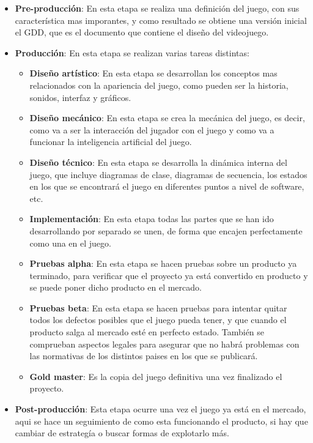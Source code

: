 \begin{itemize}
  \item \textbf{Pre-producción}: En esta etapa se realiza una definición del juego, con sus característica mas imporantes, y como resultado se obtiene una versión inicial el GDD, que es el documento que contiene el diseño del videojuego.
  \item \textbf{Producción}: En esta etapa se realizan varias tareas distintas:

  \begin{itemize}
    \item \textbf{Diseño artístico}: En esta etapa se desarrollan los conceptos mas relacionados con la apariencia del juego, como pueden ser la historia, sonidos, interfaz y gráficos.
    \item \textbf{Diseño mecánico}: En esta etapa se crea la mecánica del juego, es decir, como va a ser la interacción del jugador con el juego y como va a funcionar la inteligencia artificial del juego.
    \item \textbf{Diseño técnico}: En esta etapa se desarrolla la dinámica interna del juego, que incluye diagramas de clase, diagramas de secuencia, los estados en los que se encontrará el juego en diferentes puntos a nivel de software, etc.
    \item \textbf{Implementación}: En esta etapa todas las partes que se han ido desarrollando por separado se unen, de forma que encajen perfectamente como una en el juego.
    \item \textbf{Pruebas alpha}: En esta etapa se hacen pruebas sobre un producto ya terminado, para verificar que el proyecto ya está convertido en producto y se puede poner dicho producto en el mercado.
    \item \textbf{Pruebas beta}: En esta etapa se hacen pruebas para intentar quitar todos los defectos posibles que el juego pueda tener, y que cuando el producto salga al mercado esté en perfecto estado. También se comprueban aspectos legales para asegurar que no habrá problemas con las normativas de los distintos paises en los que se publicará.
    \item \textbf{Gold master}: Es la copia del juego definitiva una vez finalizado el proyecto.
  \end{itemize}

  \item \textbf{Post-producción}: Esta etapa ocurre una vez el juego ya está en el mercado, aqui se hace un seguimiento de como esta funcionando el producto, si hay que cambiar de estrategía o buscar formas de explotarlo más.

\end{itemize}

